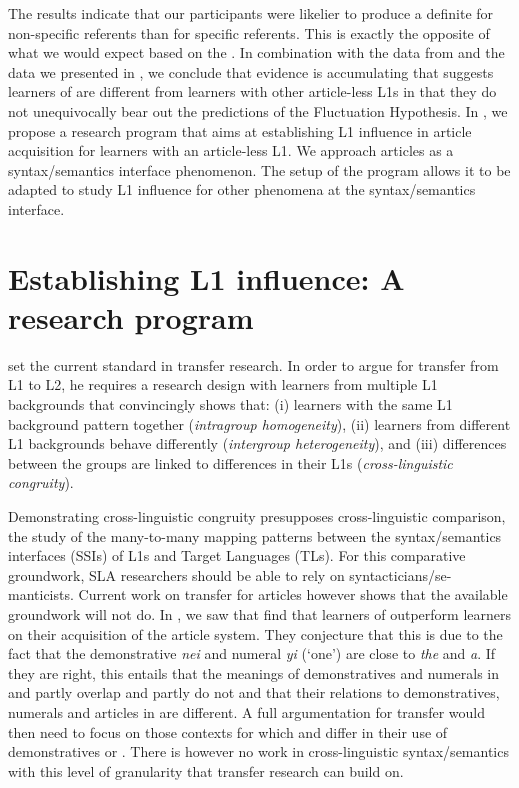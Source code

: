 \documentclass[output=paper,
modfonts
]{langscibook}
\begin{document}
The results indicate that our participants were likelier to produce a definite for non-specific referents than for specific referents. This is exactly the opposite of what we would expect based on the . In combination with the data from \citet{Ting2005} and the data we presented in , we conclude that evidence is accumulating that suggests  learners of  are different from learners with other article-less L1s in that they do not unequivocally bear out the predictions of the Fluctuation Hypothesis. In , we propose a research program that aims at establishing L1 influence in article acquisition for learners with an article-less L1. We approach articles as a syntax/semantics interface phenomenon. The setup of the program allows it to be adapted to study L1 influence for other phenomena at the syntax/semantics interface. 

\section{Establishing L1 influence: A research program}
\label{sec:lebruyn:5}

\citet{Jarvis2000} set the current standard in transfer research. In order to argue for transfer from L1 to L2, he requires a research design with learners from multiple L1 backgrounds that convincingly shows that: (i) learners with the same L1 background pattern together (\textit{intragroup homogeneity}), (ii) learners from different L1 backgrounds behave differently (\textit{intergroup heterogeneity}), and (iii) differences between the groups are linked to differences in their L1s (\textit{cross-linguistic congruity}).

Demonstrating cross-linguistic congruity presupposes cross-linguistic comparison, the study of the many-to-many mapping patterns between the syntax/semantics interfaces (SSIs) of L1s and Target Languages (TLs). For this comparative groundwork, SLA researchers should be able to rely on syntacticians/se\hyp{}manticists. Current work on transfer for articles however shows that the available groundwork will not do. In , we saw that \citet{SnapeLeungTing2006} find that  learners of  outperform  learners on their acquisition of the  article system. They conjecture that this is due to the fact that the  demonstrative \textit{nei} and numeral \textit{yi} (‘one’) are close to  \textit{the} and \textit{a}. If they are right, this entails that the meanings of demonstratives and numerals in  and  partly overlap and partly do not and that their relations to demonstratives, numerals and articles in  are different. A full argumentation for transfer would then need to focus on those contexts for which  and  differ in their use of demonstratives or . There is however no work in cross-linguistic syntax/semantics with this level of granularity that transfer research can build on.
\end{document}
